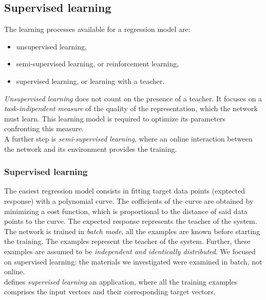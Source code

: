 \subsection{Supervised learning}
\label{subsec:supervisedlearning}

The learning processes available for a regression model are:

\begin{itemize}
  \item{unsupervised learning,}
  \item{semi-supervised learning, or reinforcement learning,}  
  \item{supervised learning, or learning with a teacher.}
\end{itemize}

\textit{Unsupervised learning} does not count on the presence of a teacher.
It focuses on a \textit{task-indipendent measure} of the quality of the
representation, which the network must learn. 
This learning model is required to optimize its
parameters confronting this measure.\\
A further step is \textit{semi-supervised learning}, where an online interaction
between the network and its environment provides the training.

\subsubsection{Supervised learning}
\label{subsubsec:supervisedlearning}

The easiest regression model consists in fitting target data
points (exptected response) with a polynomial curve.
The cofficients of the curve are obtained by minimizing a cost function, which
is proportional to the distance of said data points to the curve.
The expected response represents the teacher of the system.
The network is trained in \textit{batch mode}, all the examples are known before
starting the training.
The examples represent the teacher of the system.
Further, these examples are assumed to be \textit{independent and identically
distributed}.
We focused on supervised learning: the materials we investigated
were examined in batch, not online.\\
\citet{RefWorks:194} defines \textit{supervised learning} an application, where all the
training examples comprises the input vectors and their corresponding target
vectors.


